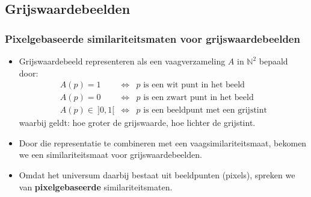 \documentclass[dutch]{beamer}
\theoremstyle{definition}
\newtheorem{definitie}[theorem]{Definitie}
\theoremstyle{remark}
\theoremstyle{example}
\begin{document}
\subsection{Grijswaardebeelden}
\frame
{
  \frametitle{Pixelgebaseerde similariteitsmaten voor grijswaardebeelden}
  \begin{itemize}
  \item Grijswaardebeeld representeren als een vaagverzameling 
  $A$ in $\mathbb{N}^2$ bepaald door:
  \begin{displaymath}
  \begin{array}{rcl}
  A(p) = 1 & \iff & p \text{ is een wit punt in het beeld} \\
  A(p) = 0 & \iff & p \text{ is een zwart punt in het beeld} \\
  A(p) \in\ ]0,1[ & \iff & p \text{ is een beeldpunt met een grijstint}
  \end{array}
  \end{displaymath}
  waarbij geldt: hoe groter de grijswaarde, hoe lichter de grijstint.
  \item Door die representatie te combineren met een vaagsimilariteitsmaat,
  bekomen we een similariteitsmaat voor grijswaardebeelden. 
  \item Omdat het universum daarbij bestaat uit beeldpunten (pixels), spreken we van
  \textbf{pixelgebaseerde} similariteitsmaten.
  \end{itemize}
}
\end{document}
